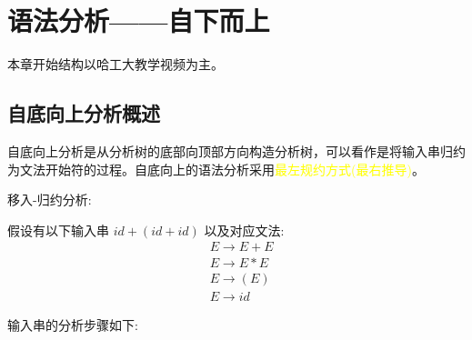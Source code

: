 \section{语法分析——自下而上}

本章开始结构以哈工大教学视频为主。

\subsection{自底向上分析概述}

自底向上分析是从分析树的底部向顶部方向构造分析树，可以看作是将输入串归约为文法开始符的过程。自底向上的语法分析采用\textcolor{mark}{最左规约方式(最右推导)}。

移入-归约分析:

假设有以下输入串 $id + (id+id)$ 以及对应文法:
\begin{equation}
    \begin{aligned}
         & E \rightarrow E+E          \\
         & E \rightarrow E*E          \\
         & E \rightarrow (E)          \\
         & E \rightarrow id \nonumber
    \end{aligned}
\end{equation}

输入串的分析步骤如下:

